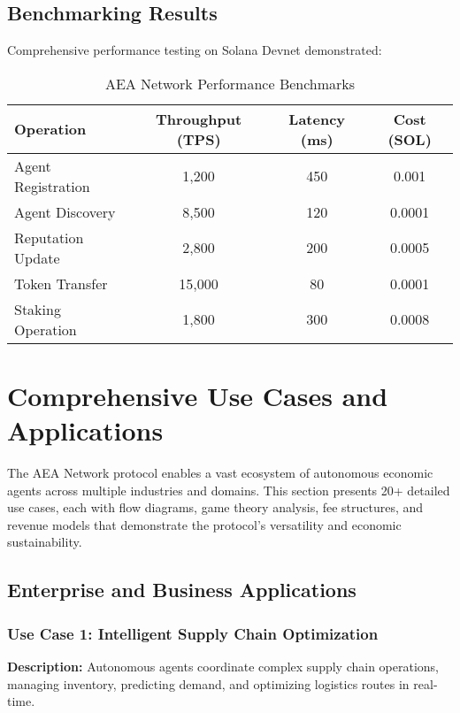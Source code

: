 \documentclass[12pt,a4paper]{article}
\begin{document}
\subsection{Benchmarking Results}

Comprehensive performance testing on Solana Devnet demonstrated:

\begin{table}[H]
\centering
\begin{tabular}{|l|c|c|c|}
\hline
\textbf{Operation} & \textbf{Throughput (TPS)} & \textbf{Latency (ms)} & \textbf{Cost (SOL)} \\
\hline
Agent Registration & 1,200 & 450 & 0.001 \\
Agent Discovery & 8,500 & 120 & 0.0001 \\
Reputation Update & 2,800 & 200 & 0.0005 \\
Token Transfer & 15,000 & 80 & 0.0001 \\
Staking Operation & 1,800 & 300 & 0.0008 \\
\hline
\end{tabular}
\caption{AEA Network Performance Benchmarks}
\end{table}

\section{Comprehensive Use Cases and Applications}

The AEA Network protocol enables a vast ecosystem of autonomous economic agents across multiple industries and domains. This section presents 20+ detailed use cases, each with flow diagrams, game theory analysis, fee structures, and revenue models that demonstrate the protocol's versatility and economic sustainability.

\subsection{Enterprise and Business Applications}

\subsubsection{Use Case 1: Intelligent Supply Chain Optimization}

\textbf{Description:} Autonomous agents coordinate complex supply chain operations, managing inventory, predicting demand, and optimizing logistics routes in real-time.
\end{document}
